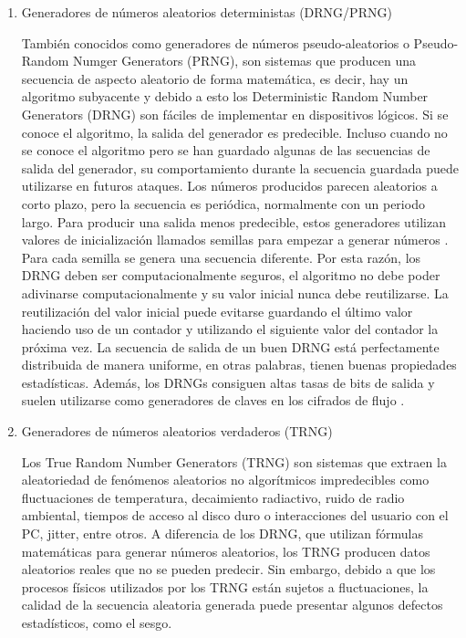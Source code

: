            \begin{enumerate}
                \item Generadores de números aleatorios deterministas (DRNG/PRNG)
                
                    También conocidos como generadores de números pseudo-aleatorios o Pseudo-Random Numger Generators (PRNG), son sistemas que producen una secuencia de aspecto aleatorio de forma matemática, es decir, hay un algoritmo subyacente y debido a esto los Deterministic Random Number Generators (DRNG) son fáciles de implementar en dispositivos lógicos. Si se conoce el algoritmo, la salida del generador es predecible. Incluso cuando no se conoce el algoritmo pero se han guardado algunas de las secuencias de salida del generador, su comportamiento durante la secuencia guardada puede utilizarse en futuros ataques. Los números producidos parecen aleatorios a corto plazo, pero la secuencia es periódica, normalmente con un periodo largo. Para producir una salida menos predecible, estos generadores utilizan valores de inicialización llamados semillas para empezar a generar números \cite{Nist2010}. Para cada semilla se genera una secuencia diferente. Por esta razón, los DRNG deben ser computacionalmente seguros, el algoritmo no debe poder adivinarse computacionalmente y su valor inicial nunca debe reutilizarse. La reutilización del valor inicial puede evitarse guardando el último valor haciendo uso de un contador y utilizando el siguiente valor del contador la próxima vez. La secuencia de salida de un buen DRNG está perfectamente distribuida de manera uniforme, en otras palabras, tienen buenas propiedades estadísticas. Además, los DRNGs consiguen altas tasas de bits de salida y suelen utilizarse como generadores de claves en los cifrados de flujo \cite{Badrignans2011}.
                
                \item Generadores de números aleatorios verdaderos (TRNG)
                
                    Los True Random Number Generators (TRNG) son sistemas que extraen la aleatoriedad de fenómenos aleatorios no algorítmicos impredecibles como fluctuaciones de temperatura, decaimiento radiactivo, ruido de radio ambiental, tiempos de acceso al disco duro o interacciones del usuario con el PC, jitter, entre otros. A diferencia de los DRNG, que utilizan fórmulas matemáticas para generar números aleatorios, los TRNG producen datos aleatorios reales que no se pueden predecir. Sin embargo, debido a que los procesos físicos utilizados por los TRNG están sujetos a fluctuaciones, la calidad de la secuencia aleatoria generada puede presentar algunos defectos estadísticos, como el sesgo.
                    

\end{enumerate}
